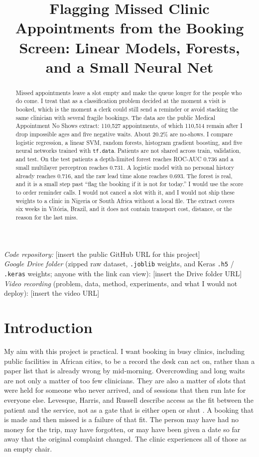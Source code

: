 \documentclass[conference]{IEEEtran}
\title{Flagging Missed Clinic Appointments from the Booking Screen: Linear Models, Forests, and a Small Neural Net}
\author{%
\IEEEauthorblockN{Sammy Niyonkuru}
}
\begin{document}
\maketitle

\noindent\textit{Code repository:} [insert the public GitHub URL for this project]\\
\textit{Google Drive folder} (zipped raw dataset, \texttt{.joblib} weights, and Keras \texttt{.h5} / \texttt{.keras} weights; anyone with the link can view): [insert the Drive folder URL]\\
\textit{Video recording} (problem, data, method, experiments, and what I would not deploy): [insert the video URL]

\begin{abstract}
Missed appointments leave a slot empty and make the queue longer for the people who do come. I treat that as a classification problem decided at the moment a visit is booked, which is the moment a clerk could still send a reminder or avoid stacking the same clinician with several fragile bookings. The data are the public Medical Appointment No Shows extract: 110,527 appointments, of which 110,514 remain after I drop impossible ages and five negative waits. About 20.2\% are no-shows. I compare logistic regression, a linear SVM, random forests, histogram gradient boosting, and five neural networks trained with \texttt{tf.data}. Patients are not shared across train, validation, and test. On the test patients a depth-limited forest reaches ROC-AUC 0.736 and a small multilayer perceptron reaches 0.731. A logistic model with no personal history already reaches 0.716, and the raw lead time alone reaches 0.693. The forest is real, and it is a small step past ``flag the booking if it is not for today.'' I would use the score to order reminder calls. I would not cancel a slot with it, and I would not ship these weights to a clinic in Nigeria or South Africa without a local file. The extract covers six weeks in Vit\'{o}ria, Brazil, and it does not contain transport cost, distance, or the reason for the last miss.
\end{abstract}

\section{Introduction}
My aim with this project is practical. I want booking in busy clinics, including public facilities in African cities, to be a record the desk can act on, rather than a paper list that is already wrong by mid-morning. Overcrowding and long waits are not only a matter of too few clinicians. They are also a matter of slots that were held for someone who never arrived, and of sessions that then run late for everyone else. Levesque, Harris, and Russell describe access as the fit between the patient and the service, not as a gate that is either open or shut \cite{levesque2013}. A booking that is made and then missed is a failure of that fit. The person may have had no money for the trip, may have forgotten, or may have been given a date so far away that the original complaint changed. The clinic experiences all of those as an empty chair.
\end{document}
